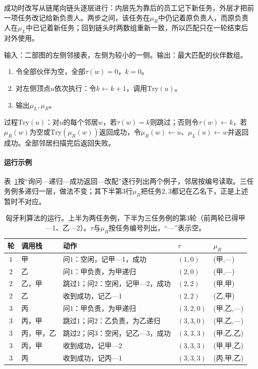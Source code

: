 成功时改写从链尾向链头逐层进行：内层先为靠后的员工记下新任务，外层才把前一项任务改记给新负责人。两步之间，该任务在$\mu_R$中仍记着原负责人，而原负责人在$\mu_L$中已记着新任务；回到链头时两数组重新一致，所以匹配只在一轮结束后对外使用。

\begin{algorithm}[匈牙利算法]
\label{alg:graph-opt-augmenting-matching}
输入：二部图的左侧邻接表，左侧为较小的一侧。输出：最大匹配的伙伴数组。
\begin{enumerate}
  \item 令全部伙伴为空，全部$\tau(w)=0$，$k=0$。
  \item 对左侧顶点$u$依次执行：令$k\gets k+1$，调用$\mathrm{Try}(u)$。
  \item 输出$\mu_L,\mu_R$。
\end{enumerate}
过程$\mathrm{Try}(u)$：对$u$的每个邻居$w$，若$\tau(w)=k$则跳过；否则令$\tau(w)\gets k$，若$\mu_R(w)$为空或$\mathrm{Try}(\mu_R(w))$返回成功，令$\mu_R(w)\gets u$、$\mu_L(u)\gets w$并返回成功。全部邻居扫描完后返回失败。
\end{algorithm}

\paragraph{运行示例}
表~\ref{tab:graph-opt-match-trace}按“询问—递归—成功返回—改配”逐行列出两个例子，邻居按编号读取。三任务例多递归一层，做法不变；其下半第$3$行$\mu_R$把任务$2,3$都记在乙名下，正是上述暂时不对应。

\begin{table}[!htb]
  \centering\small
  \begin{tabular}{@{}cllll@{}}
    \toprule
    轮 & 调用栈 & 动作 & $\tau$ & $\mu_R$ \\
    \midrule
    $1$ & 甲 & 问$1$：空闲，记甲—1，成功 & $(1,0)$ & (甲,—) \\
    $2$ & 乙 & 问$1$：甲负责，为甲递归 & $(2,0)$ & (甲,—) \\
    $2$ & 乙，甲 & 跳过$1$；问$2$：空闲，记甲—2，成功 & $(2,2)$ & (甲,甲) \\
    $2$ & 乙 & 收到成功，记乙—1 & $(2,2)$ & (乙,甲) \\
    \midrule
    $3$ & 丙 & 问$1$：甲负责，为甲递归 & $(3,2,0)$ & (甲,乙,—) \\
    $3$ & 丙，甲 & 跳过$1$；问$2$：乙负责，为乙递归 & $(3,3,0)$ & (甲,乙,—) \\
    $3$ & 丙，甲，乙 & 跳过$2$；问$3$：空闲，记乙—3，成功 & $(3,3,3)$ & (甲,乙,乙) \\
    $3$ & 丙，甲 & 收到成功，记甲—2 & $(3,3,3)$ & (甲,甲,乙) \\
    $3$ & 丙 & 收到成功，记丙—1 & $(3,3,3)$ & (丙,甲,乙) \\
    \bottomrule
  \end{tabular}
  \caption{匈牙利算法的运行。上半为两任务例，下半为三任务例的第$3$轮（前两轮已得甲—1、乙—2）。$\tau$与$\mu_R$按任务编号列出，“—”表示空。}
  \label{tab:graph-opt-match-trace}
\end{table}

